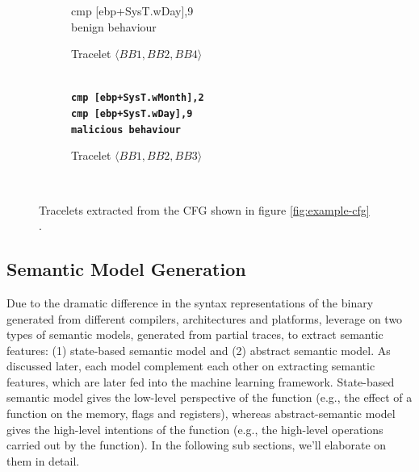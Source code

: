 \begin{figure}[!h]
\begin{subfigure}[b]{0.5\linewidth}
{{{   		%
   		cmp [ebp+SysT.wDay],9\\
   		benign behaviour
    }}}
    \caption{\small{Tracelet $\langle BB1, BB2, BB4\rangle$}}
    \label{fig:traceletc}
  \end{subfigure}%
  \begin{subfigure}[b]{0.5\linewidth}
    \centering
   \raggedright{\textbf{\texttt{
    \\
   		cmp [ebp+SysT.wMonth],2\\
   		cmp [ebp+SysT.wDay],9\\
   		malicious behaviour
    }}}
    \caption{\small{Tracelet $\langle BB1, BB2, BB3\rangle$}}
    \label{fig:traceletd}
  \end{subfigure}
  \\
  \caption{Tracelets extracted from the CFG shown in figure \ref{fig:example-cfg}\\.\\}
  \label{fig:ex-tracelet}
\end{figure}


\subsection{Semantic Model Generation} \label{subsec:sem_mod}

Due to the dramatic difference in the syntax representations of the binary generated from different compilers, architectures and platforms,
\tool leverage on two types of semantic models, generated from partial traces, to extract semantic features: (1) state-based semantic model and (2) abstract semantic model. As discussed later, each model complement each other on extracting semantic features, which are later fed into the machine learning framework. State-based semantic model gives the low-level perspective of the function (e.g., the effect of a function on the memory, flags and registers), whereas abstract-semantic model gives the high-level intentions of the function (e.g., the high-level operations carried out by the function). In the following sub sections, we'll elaborate on them in detail.


